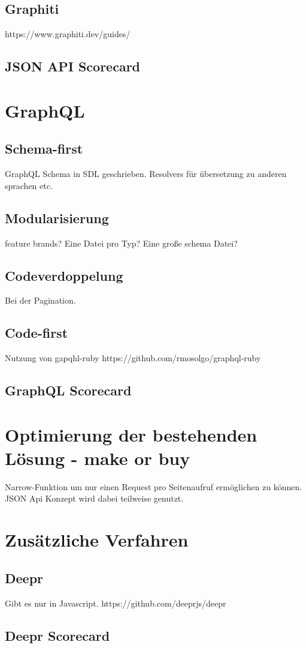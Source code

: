 \subsection{Graphiti}
https://www.graphiti.dev/guides/
\subsection{JSON API Scorecard}
\section{GraphQL}
\subsection{Schema-first}
GraphQL Schema in SDL geschrieben. Resolvers für übersetzung zu anderen sprachen etc.
\subsection{Modularisierung}
feature brands?
Eine Datei pro Typ?
Eine große schema Datei?
\subsection{Codeverdoppelung}
Bei der Pagination.
\subsection{Code-first}
Nutzung von gapqhl-ruby
https://github.com/rmosolgo/graphql-ruby
\subsection{GraphQL Scorecard}
\section{Optimierung der bestehenden Lösung - make or buy}
Narrow-Funktion um nur einen Request pro Seitenaufruf ermöglichen zu können. JSON Api Konzept wird dabei teilweise genutzt.
\section{Zusätzliche Verfahren}
\subsection{Deepr}
Gibt es nur in Javascript.
https://github.com/deeprjs/deepr
\subsection{Deepr Scorecard}
